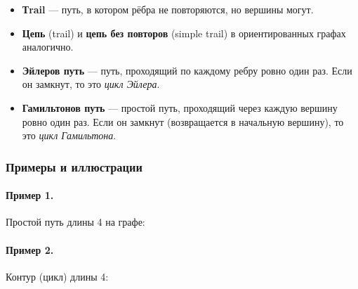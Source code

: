 \begin{itemize}[leftmargin=*]
  \item \textbf{Тrail} — путь, в котором рёбра не повторяются, но вершины могут.
  \item \textbf{Цепь} (trail) и \textbf{цепь без повторов} (simple trail) в ориентированных графах аналогично.
  \item \textbf{Эйлеров путь} — путь, проходящий по каждому ребру ровно один раз. Если он замкнут, то это \emph{цикл Эйлера}.
  \item \textbf{Гамильтонов путь} — простой путь, проходящий через каждую вершину ровно один раз. Если он замкнут (возвращается в начальную вершину), то это \emph{цикл Гамильтона}.
\end{itemize}

\subsubsection{Примеры и иллюстрации}

\paragraph{Пример 1.} Простой путь длины 4 на графе:

\begin{center}
\end{center}

\paragraph{Пример 2.} Контур (цикл) длины 4:

\begin{center}
\end{center}


